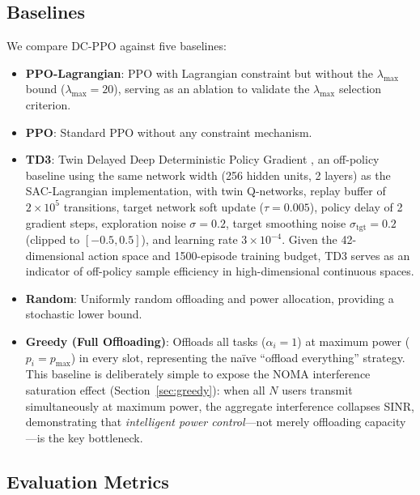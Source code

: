 \documentclass[journal]{IEEEtran}
\begin{document}
\subsection{Baselines}

We compare DC-PPO against five baselines:

\begin{itemize}
  \item \textbf{PPO-Lagrangian}: PPO with Lagrangian constraint but
    without the $\lambda_{\max}$ bound ($\lambda_{\max}{=}20$),
    serving as an ablation to validate the $\lambda_{\max}$
    selection criterion.

  \item \textbf{PPO}: Standard PPO without any constraint mechanism.

  \item \textbf{TD3}: Twin Delayed Deep Deterministic Policy Gradient
    \cite{fujimoto2018td3}, an off-policy baseline using the same
    network width (256 hidden units, 2 layers) as the
    SAC-Lagrangian implementation, with twin Q-networks, replay
    buffer of $2\times10^5$ transitions, target network soft update
    ($\tau{=}0.005$), policy delay of 2 gradient steps,
    exploration noise $\sigma{=}0.2$, target smoothing noise
    $\sigma_{\text{tgt}}{=}0.2$ (clipped to $[-0.5, 0.5]$),
    and learning rate $3\times10^{-4}$.
    Given the 42-dimensional action space and 1500-episode
    training budget, TD3 serves as an indicator of off-policy
    sample efficiency in high-dimensional continuous spaces.

  \item \textbf{Random}: Uniformly random offloading and power
    allocation, providing a stochastic lower bound.

  \item \textbf{Greedy (Full Offloading)}: Offloads all tasks
    ($\alpha_i{=}1$) at maximum power ($p_i{=}p_{\max}$) in every
    slot, representing the na\"ive ``offload everything'' strategy.
    This baseline is deliberately simple to expose the NOMA
    interference saturation effect (Section~\ref{sec:greedy}):
    when all $N$ users transmit simultaneously at maximum power,
    the aggregate interference collapses SINR,
    demonstrating that \emph{intelligent power control}---not
    merely offloading capacity---is the key bottleneck.
\end{itemize}

\subsection{Evaluation Metrics}
\end{document}
